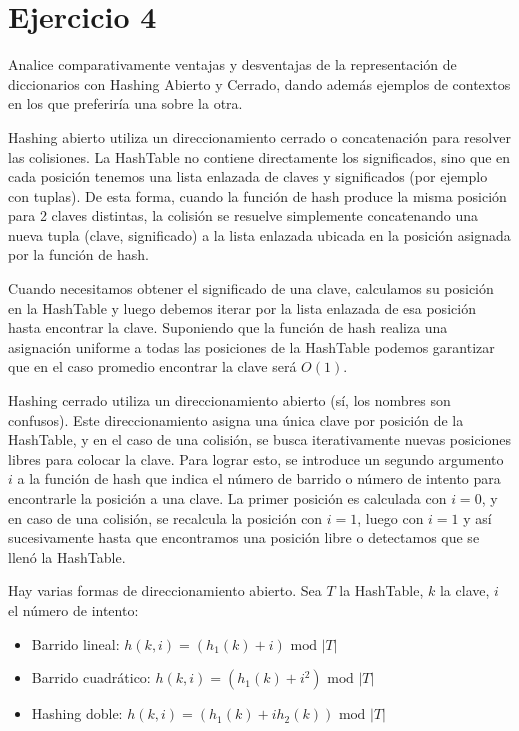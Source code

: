 \section*{Ejercicio 4}

Analice comparativamente ventajas y desventajas de la representación de diccionarios con Hashing Abierto y Cerrado, dando además ejemplos de contextos en los que preferiría una sobre la otra.

Hashing abierto utiliza un direccionamiento cerrado o concatenación para resolver las colisiones. La HashTable no contiene directamente los significados, sino que en cada posición tenemos una lista enlazada de claves y significados (por ejemplo con tuplas). De esta forma, cuando la función de hash produce la misma posición para 2 claves distintas, la colisión se resuelve simplemente concatenando una nueva tupla (clave, significado) a la lista enlazada ubicada en la posición asignada por la función de hash.

Cuando necesitamos obtener el significado de una clave, calculamos su posición en la HashTable y luego debemos iterar por la lista enlazada de esa posición hasta encontrar la clave. Suponiendo que la función de hash realiza una asignación uniforme a todas las posiciones de la HashTable podemos garantizar que en el caso promedio encontrar la clave será $O(1)$.

Hashing cerrado utiliza un direccionamiento abierto (sí, los nombres son confusos). Este direccionamiento asigna una única clave por posición de la HashTable, y en el caso de una colisión, se busca iterativamente nuevas posiciones libres para colocar la clave. Para lograr esto, se introduce un segundo argumento $i$ a la función de hash que indica el número de barrido o número de intento para encontrarle la posición a una clave. La primer posición es calculada con $i=0$, y en caso de una colisión, se recalcula la posición con $i=1$, luego con $i=1$ y así sucesivamente hasta que encontramos una posición libre o detectamos que se llenó la HashTable.

Hay varias formas de direccionamiento abierto. Sea $T$ la HashTable, $k$ la clave, $i$ el número de intento:

\begin{itemize}
    \item Barrido lineal: $h(k, i) = (h_1(k) + i) \text{ mod } |T|$
    \item Barrido cuadrático: $h(k, i) = (h_1(k) + i^2) \text{ mod } |T|$
    \item Hashing doble: $h(k, i) = (h_1(k) + i h_2(k)) \text{ mod } |T|$
\end{itemize}

